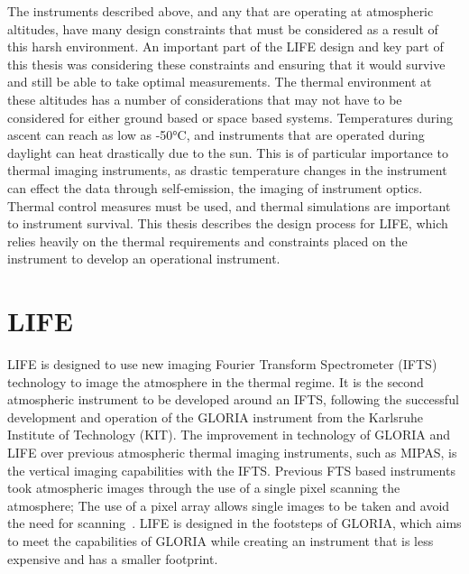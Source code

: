 The instruments described above, and any that are operating at atmospheric altitudes, have many design constraints that must be considered as a result of this harsh environment. An important part of the LIFE design and key part of this thesis was considering these constraints and ensuring that it would survive and still be able to take optimal measurements. The thermal environment at these altitudes has a number of considerations that may not have to be considered for either ground based or space based systems. Temperatures during ascent can reach as low as -50°C, and instruments that are operated during daylight can heat drastically due to the sun. This is of particular importance to thermal imaging instruments, as drastic temperature changes in the instrument can effect the data through self-emission, the imaging of instrument optics. Thermal control measures must be used, and thermal simulations are important to instrument survival. This thesis describes the design process for LIFE, which relies heavily on the thermal requirements and constraints placed on the instrument to develop an operational instrument.

\section{LIFE}

LIFE is designed to use new imaging Fourier Transform Spectrometer (IFTS) technology to image the atmosphere in the thermal regime. It is the second atmospheric instrument to be developed around an IFTS, following the successful development and operation of the GLORIA instrument from the Karlsruhe Institute of Technology (KIT). The improvement in technology of GLORIA and LIFE over previous atmospheric thermal imaging instruments, such as MIPAS, is the vertical imaging capabilities with the IFTS. Previous FTS based instruments took atmospheric images through the use of a single pixel scanning the atmosphere; The use of a pixel array allows single images to be taken and avoid the need for scanning~\citep{GLORIA_objectives}. LIFE is designed in the footsteps of GLORIA, which aims to meet the capabilities of GLORIA while creating an instrument that is less expensive and has a smaller footprint. 

